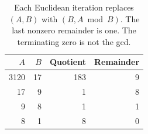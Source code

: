 \begin{table}[!ht]
  \centering
  \begin{tabular}{r r r r}
    \toprule
    $A$  & $B$ & Quotient & Remainder \\
    \midrule
    3120 & 17  & 183      & 9         \\
    17   & 9   & 1        & 8         \\
    9    & 8   & 1        & 1         \\
    8    & 1   & 8        & 0         \\
    \bottomrule
  \end{tabular}
  \caption{Each Euclidean iteration replaces $(A,B)$ with $(B,A\bmod B)$. The last nonzero remainder is one. The terminating zero is not the gcd.}
  \label{tab:revision-rsa-euclid}
\end{table}
